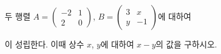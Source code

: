 두 행렬 $A=\begin{pmatrix} -2 & 1 \\ 2 & 0 \end{pmatrix}$, $B=\begin{pmatrix} 3 & x \\ y & -1 \end{pmatrix}$에 대하여\par\smallskip{}\par\smallskip\noindent 이 성립한다. 이때 상수 $x$, $y$에 대하여 $x-y$의 값을 구하시오.
